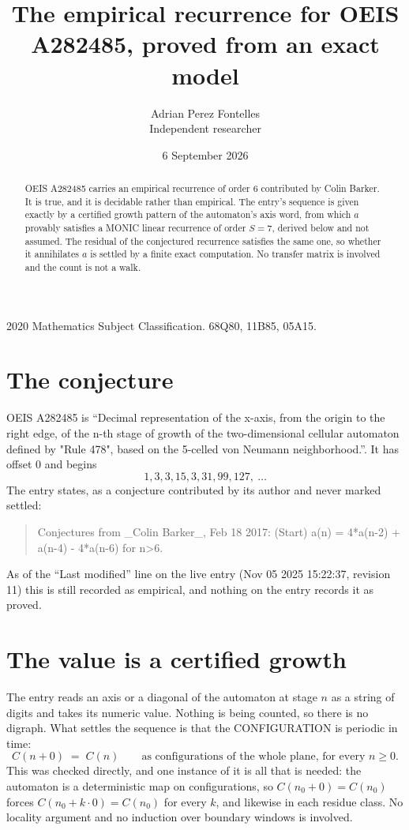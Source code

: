 \documentclass[11pt,a4paper]{article}
\title{The empirical recurrence for OEIS A282485, proved from an exact model}
\author{Adrian Perez Fontelles\\ \small Independent researcher}
\date{6 September 2026}
\theoremstyle{plain}
\theoremstyle{definition}
\begin{document}
\maketitle

\begin{abstract}
OEIS A282485 carries an empirical recurrence of order $6$ contributed by Colin Barker. It is true, and it is
decidable rather than empirical. The entry's sequence is given exactly by a certified growth pattern of the automaton's axis word, from
which $a$ provably satisfies a MONIC linear recurrence of order $S=7$, derived below and not
assumed. The residual of the conjectured recurrence satisfies the same one, so whether it
annihilates $a$ is settled by a finite exact computation. No transfer matrix is involved and
the count is not a walk.
\end{abstract}

\noindent\small 2020 Mathematics Subject Classification. 68Q80, 11B85, 05A15.\normalsize

\section{The conjecture}

OEIS A282485 is ``Decimal representation of the x-axis, from the origin to the right edge, of the n-th stage of growth of the two-dimensional cellular automaton defined by "Rule 478", based on the 5-celled von Neumann neighborhood.''. It has offset $0$ and begins
\[
1, 3, 3, 15, 3, 31, 99, 127,\ \dots
\]
The entry states, as a conjecture contributed by its author and never marked settled:
\begin{quote}
Conjectures from \_Colin Barker\_, Feb 18 2017: (Start) a(n) = 4*a(n-2) + a(n-4) - 4*a(n-6) for n>6.
\end{quote}
As of the ``Last modified'' line on the live entry (Nov 05 2025 15:22:37, revision 11)
this is still recorded as empirical, and nothing on the entry records it as proved.

\section{The value is a certified growth}

The entry reads an axis or a diagonal of the automaton at stage $n$ as a string of digits and
takes its numeric value. Nothing is being counted, so there is no digraph. What settles the
sequence is that the CONFIGURATION is periodic in time:
\[
C(n+0)\;=\;C(n)\qquad\text{as configurations of the whole plane, for every } n\ge 0.
\]
This was checked directly, and one instance of it is all that is needed: the automaton is a
deterministic map on configurations, so $C(n_0+0)=C(n_0)$ forces $C(n_0+k\cdot0)=C(n_0)$ for
every $k$, and likewise in each residue class. No locality argument and no induction over
boundary windows is involved.
\end{document}
